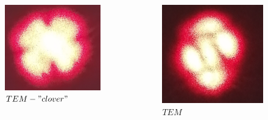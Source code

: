 \documentclass{beamer}
\begin{document}
\begin{frame}
		\vspace{-10pt}
		
		\begin{columns}
			\begin{column}{0.4\textwidth}
				\begin{figure}
					\centering
					\includegraphics[width=0.7\linewidth]{res/tem_strange_2.png}
					\caption{\footnotesize$TEM-"clover"$ }
				\end{figure}
			\end{column}
			\begin{column}{0.3\textwidth}
				\begin{figure}
					\centering
					\includegraphics[width=0.8\linewidth]{res/tem_strange_1.png}
					\caption{\footnotesize $TEM$}
				\end{figure}
			\end{column}
		\end{columns}		
	\end{frame}
	
\end{document}
